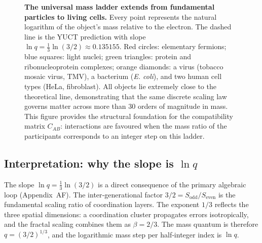 \documentclass[11pt,a4paper]{article}
\begin{document}
\begin{figure}[H]
	\caption{\textbf{The universal mass ladder extends from fundamental particles to living cells.}
		Every point represents the natural logarithm of the object's mass relative to the electron.
		The dashed line is the YUCT prediction with slope \(\ln q = \frac{1}{3}\ln(3/2) \approx 0.135155\).
		Red circles: elementary fermions; blue squares: light nuclei; green triangles: protein and ribonucleoprotein complexes; orange diamonds: a virus (tobacco mosaic virus, TMV), a bacterium (\textit{E. coli}), and two human cell types (HeLa, fibroblast).
		All objects lie extremely close to the theoretical line, demonstrating that the same discrete scaling law governs matter across more than 30 orders of magnitude in mass.
		This figure provides the structural foundation for the compatibility matrix \(C_{AB}\): interactions are favoured when the mass ratio of the participants corresponds to an integer step on this ladder.}
	\label{fig:ladder_cells}
\end{figure}

\subsection{Interpretation: why the slope is \(\ln q\)}

The slope \(\ln q = \frac{1}{3}\ln(3/2)\) is a direct consequence of the primary algebraic loop (Appendix~AF). The inter‑generational factor \(3/2 = S_{\mathrm{odd}}/S_{\mathrm{even}}\) is the fundamental scaling ratio of coordination layers. The exponent \(1/3\) reflects the three spatial dimensions: a coordination cluster propagates errors isotropically, and the fractal scaling combines them as \(\beta = 2/3\). The mass quantum is therefore \(q = (3/2)^{1/3}\), and the logarithmic mass step per half‑integer index is \(\ln q\).
\end{document}
